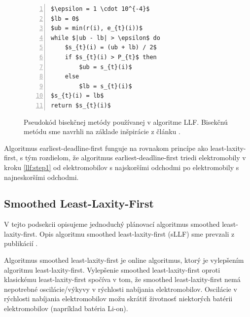 \begin{figure}[H]
 \begin{lstlisting}[mathescape,numbers=left]
$\epsilon = 1 \cdot 10^{-4}$ 
$lb = 0$
$ub = min(r(i), e_{t}(i))$ 
while $|ub - lb| > \epsilon$ do
    $s_{t}(i) = (ub + lb) / 2$
    if $s_{t}(i) > P_{t}$ then
        $ub = s_{t}(i)$
    else
        $lb = s_{t}(i)$
$s_{t}(i) = lb$
return $s_{t}(i)$
 \end{lstlisting}
 \caption[Pseudokód bisekčnej metódy používanej v algoritme LLF]{Pseudokód bisekčnej metódy používanej v algoritme LLF. Bisekčnú metódu sme navrhli na základe inšpirácie z článku \cite{Chen2014ElectricVCbisection}.}
 \label{llf:bisection}
\end{figure}
 
Algoritmus earliest-deadline-first funguje na rovnakom princípe ako least-laxity-first, s tým rozdielom, že algoritmus earliest-deadline-first triedi elektromobily v kroku \ref{llf:step1} od elektromobilov s najskoršími odchodmi po elektromobily s najneskoršími odchodmi.

 
 \subsection{Smoothed Least-Laxity-First}
 \label{trivial-scheduling-algs:sllf}
 V tejto podsekcii opisujeme jednoduchý plánovací algoritmus smoothed least-laxity-first.
 Opis algoritmu smoothed least-laxity-first (sLLF) sme prevzali z publikácií \cite{chen2021smoothed,chen2017smoothed}.
 

 Algoritmus smoothed least-laxity-first je online algoritmus, ktorý je vylepšením algoritmu least-laxity-first. Vylepšenie smoothed least-laxity-first oproti klasickému least-laxity-first spočíva v tom, že smoothed least-laxity-first nemá nepotrebné oscilácie/výkyvy v rýchlosti nabíjania elektromobilov. Oscilácie v rýchlosti nabíjania elektromobilov možu skrátiť životnosť niektorých batérii elektromobilov (napríklad batéria Li-on).  
 
